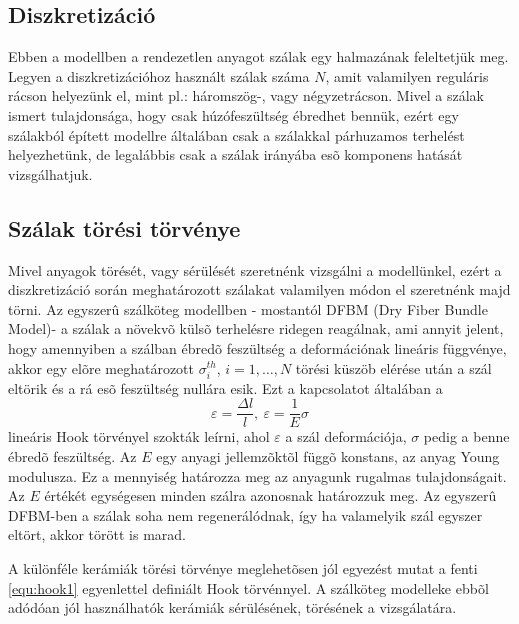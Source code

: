 \subsection{Diszkretizáció}
\par Ebben a modellben a rendezetlen anyagot szálak egy halmazának feleltetjük
meg. Legyen a diszkretizációhoz használt szálak száma $N$, amit valamilyen
reguláris rácson helyezünk el, mint pl.: háromszög-, vagy négyzetrácson. 
Mivel a szálak ismert tulajdonsága, hogy csak húzófeszültség ébredhet bennük,
ezért egy szálakból épített modellre általában csak a szálakkal párhuzamos
terhelést helyezhetünk, de legalábbis csak a szálak irányába esõ komponens
hatását vizsgálhatjuk.
\subsection{Szálak törési törvénye}
\par Mivel anyagok törését, vagy sérülését szeretnénk vizsgálni a modellünkel,
ezért a diszkretizáció során meghatározott szálakat valamilyen módon el
szeretnénk majd törni. Az egyszerû szálköteg modellben - mostantól DFBM (Dry
Fiber Bundle Model)- a szálak a növekvõ külsõ terhelésre ridegen reagálnak, ami
annyit jelent, hogy amennyiben a szálban ébredõ feszültség a deformációnak
lineáris függvénye, akkor egy elõre meghatározott $\sigma_i^{th}$,
$i=1,\ldots,N$ törési küszöb elérése után a szál eltörik és a rá esõ feszültség
nullára esik. Ezt a kapcsolatot általában a
\begin{equation}
\label{equ:hook1}\varepsilon=\frac{\Delta l}{l},\ \varepsilon=\frac{1}{E}\sigma
\end{equation} 
lineáris Hook törvényel szokták leírni, ahol $\varepsilon$ a szál deformációja,
$\sigma$ pedig a benne ébredõ feszültség. Az $E$ egy anyagi jellemzõktõl függõ
konstans, az anyag Young modulusza. Ez a mennyiség határozza meg az anyagunk
rugalmas tulajdonságait. Az $E$ értékét egységesen minden szálra azonosnak
határozzuk meg. Az egyszerû DFBM-ben a szálak soha nem regenerálódnak, így ha
valamelyik szál egyszer eltört, akkor törött is marad.
\par A különféle kerámiák törési törvénye meglehetõsen jól egyezést mutat a 
fenti \ref{equ:hook1} egyenlettel definiált Hook törvénnyel. A szálköteg
modelleke ebbõl adódóan jól használhatók kerámiák sérülésének, törésének a
vizsgálatára.
